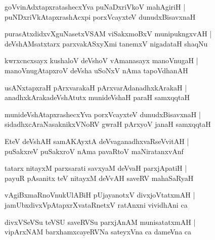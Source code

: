 \documentclass[twoside,12pt,openright]{book}
\newcounter{shloka}[chapter]
\begin{document}
\begin{shloka}
goVvinAdxtapxratashecxYva puNaDxriVkoV mahAgiriH |\\
puNDxriVkAtapxrashAcxpi porxVcayxteV dunudxBisavxnaH
\end{shloka}

\begin{shloka}
purasAtxdidxvXguNasetxVSAM viSakxmoBxV munipukngxvAH |\\
deVshAMsatxtarx parxvakASxyXmi tanemxV nigadataH shaqNu
\end{shloka}

\begin{shloka}
kwrxcncxsayx kushaloV deVshoV vAmanasayx manoVnugaH |\\
manoVnugAtapxroV deVsha uSoNxV nAma tapoVdhanAH
\end{shloka}

\begin{shloka}
usANxtapxraH pArxvarakaH pArxvarAdanadhxkArakaH |\\
anadhxkArakadeVshAtutx munideVshaH paraH samxqqtaH 
\end{shloka}

\begin{shloka}
munideVshAtapxrashecxYva porxVcayxteV dunudxBisavxnaH |\\
sidadhxcAraNasaknikxVNoRV gwraH pArxyoV janaH samxqqtaH
\end{shloka}

\begin{shloka}
EteV deVshAH samAKAyxtA deVvaganadhxvaRseVvitAH |\\
puSakxreV puSakxroV nAma pavaRtoV maNiratanxvAnf
\end{shloka}

\begin{shloka}
tatarx nitayxM parxsarati savxyaM deVvaH parxjApatiH |\\
payuR pAsanitx teV nitayxM deVvAH saveRV mahaSaRyaH
\end{shloka}

\begin{shloka}
vAgiBxmaRnoVnukUlABiH pUjayanotxV divxjoVtatxmAH |\\
jamUbxdivxVpAtapxrXvataRnetxV ratAnxni vividhAni ca
\end{shloka}

\begin{shloka}
divxVSeVSu teVSU saveRVSu parxjAnAM munisatatxmAH |\\
vipArxNAM barxhamxcayeRVNa sateyxVna ca dameVna ca 
\end{shloka}
\end{document}
